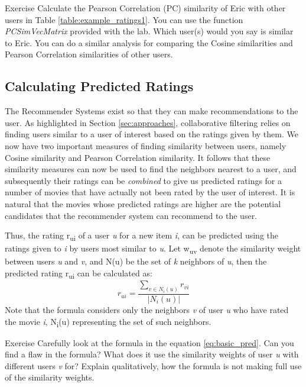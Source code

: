 \begin{myremark}{Exercise }
Calculate the Pearson Correlation (PC) similarity of Eric with other users in Table \ref{table:example_ratings1}. You can use the function \textit{PCSimVecMatrix} provided with the lab. Which user(s) would you say is similar to Eric. You can do a similar analysis for comparing the Cosine similarities and Pearson Correlation similarities of other users.
\end{myremark}

\subsection{Calculating Predicted Ratings}
The Recommender Systems exist so that they can make recommendations to the user. As highlighted in Section \ref{sec:approaches}, collaborative filtering relies on finding users similar to a user of interest based on the ratings given by them. We now have two important measures of finding similarity between users, namely Cosine similarity and Pearson Correlation similarity. It follows that these similarity measures can now be used to find the neighbors nearest to a user, and subsequently their ratings can be \textit{combined} to give us predicted ratings for a number of movies that have actually not been rated by the user of interest. It is natural that the movies whose predicted ratings are higher are the potential candidates that the recommender system can recommend to the user.

Thus, the rating r\textsubscript{ui} of a user \textit{u} for a new item \textit{i}, can be predicted using the ratings given to \textit{i} by users most similar to \textit{u}. Let w\textsubscript{uv} denote the similarity weight between users \textit{u} and \textit{v}, and N(u) be the set of \textit{k} neighbors of \textit{u}, then the predicted rating r\textsubscript{ui} can be calculated as:
\begin{equation} \label{eq:basic_pred}
r_{ui} = \frac
{\sum_{v \in{N_{i}(u)}}^{}{r_{vi}}}
{|N_{i}(u)|}
\end{equation}
Note that the formula considers only the neighbors \textit{v} of user \textit{u} who have rated the movie \textit{i}, N\textsubscript{i}(u) representing the set of such neighbors.

\begin{myremark}{Exercise }
Carefully look at the formula in the equation \ref{eq:basic_pred}. Can you find a flaw in the formula? What does it use the similarity weights of user \textit{u} with different users \textit{v} for? Explain qualitatively, how the formula is not making full use of the similarity weights.
\end{myremark}


